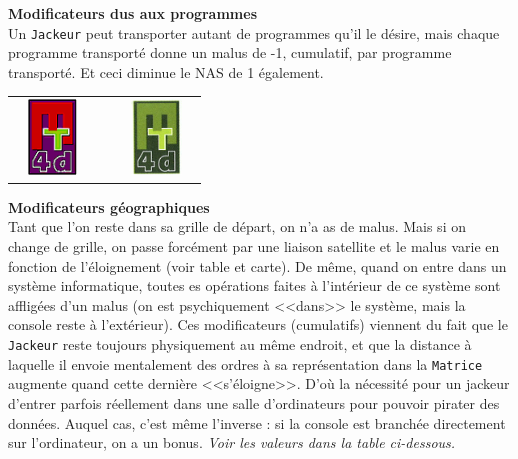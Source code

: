 \documentclass[11pt,twoside,a4paper]{article}
\def\imgCAMatrixTools{\includegraphics[width=2.00cm,height=2.00cm]{img/logomt4d.png} }
\def\imgCAMatrixToolsGreen{\includegraphics[width=2.00cm,height=2.00cm]{img/logomt4d-vert.png} }
\begin{document}
\begin{multicols*}{2}
\textbf{Modificateurs dus aux programmes}~\\
Un \texttt{Jackeur} peut transporter autant de programmes qu'il le d{\'e}sire, mais chaque programme transport{\'e} donne un malus de -1, cumulatif, par programme transport{\'e}. Et ceci diminue le NAS de 1 {\'e}galement. ~\\

\begin{center} \begin{tabular}[h]{ c p{3.00cm} c }
	\imgCAMatrixTools	&			&	\imgCAMatrixToolsGreen	\\
\end{tabular} \end{center}

\vfill
\columnbreak

\textbf{Modificateurs g{\'e}ographiques}~\\
Tant que l'on reste dans sa grille de d{\'e}part, on n'a as de malus. Mais si on change de grille, on passe forc{\'e}ment par une liaison satellite et le malus varie en fonction de l'{\'e}loignement (voir table et carte). De m{\^e}me, quand on entre dans un syst{\`e}me informatique, toutes es op{\'e}rations faites {\`a} l'int{\'e}rieur de ce syst{\`e}me sont afflig{\'e}es d'un malus (on est psychiquement <<dans>> le syst{\`e}me, mais la console reste {\`a} l'ext{\'e}rieur). Ces modificateurs (cumulatifs) viennent du fait que le \texttt{Jackeur} reste toujours physiquement au m{\^e}me endroit, et que la distance {\`a} laquelle il envoie mentalement des ordres {\`a} sa repr{\'e}sentation dans la \texttt{Matrice} augmente quand cette derni{\`e}re <<s'{\'e}loigne>>. D'o{\`u} la n{\'e}cessit{\'e} pour un jackeur d'entrer parfois r{\'e}ellement dans une salle d'ordinateurs pour pouvoir pirater des donn{\'e}es. Auquel cas, c'est m{\^e}me l'inverse : si la console est branch{\'e}e directement sur l'ordinateur, on a un bonus. \emph{Voir les valeurs dans la table ci-dessous. } %


\end{multicols*}
\end{document}
